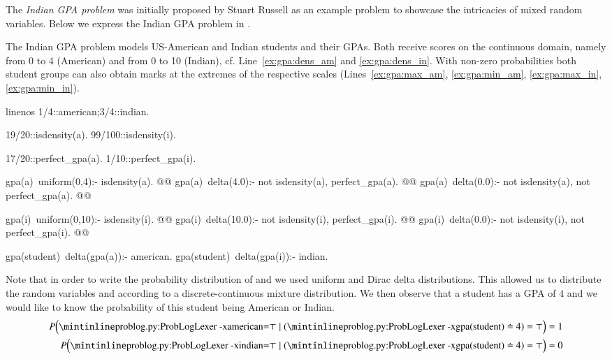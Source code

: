 The {\em Indian GPA problem} was initially proposed by Stuart Russell as an example problem to showcase the intricacies of mixed random variables.
Below we express the Indian GPA problem in \dcproblogsty.

\begin{example} \label{ex:indian_gpa}
The Indian GPA problem models US-American and Indian students and their GPAs. Both receive scores on the continuous domain, namely from 0 to 4 (American) and from 0 to 10 (Indian), cf. Line~\ref{ex:gpa:dens_am} and \ref{ex:gpa:dens_in}. With non-zero probabilities both student groups can also obtain marks at the extremes of the respective scales (Lines~\ref{ex:gpa:max_am}, \ref{ex:gpa:min_am}, \ref{ex:gpa:max_in}, \ref{ex:gpa:min_in}). 

\begin{problog*}{linenos}
1/4::american;3/4::indian.

19/20::isdensity(a).
99/100::isdensity(i).

17/20::perfect_gpa(a).
1/10::perfect_gpa(i).

gpa(a)~uniform(0,4):- isdensity(a). @\label{ex:gpa:dens_am}@
gpa(a)~delta(4.0):- not isdensity(a), perfect_gpa(a).  @\label{ex:gpa:max_am}@
gpa(a)~delta(0.0):- not isdensity(a), not perfect_gpa(a). @\label{ex:gpa:min_am}@
     
gpa(i)~uniform(0,10):- isdensity(i). @\label{ex:gpa:dens_in}@
gpa(i)~delta(10.0):- not isdensity(i), perfect_gpa(i).  @\label{ex:gpa:max_in}@
gpa(i)~delta(0.0):- not isdensity(i), not perfect_gpa(i).  @\label{ex:gpa:min_in}@
    
gpa(student)~delta(gpa(a)):- american.
gpa(student)~delta(gpa(i)):- indian.
\end{problog*}
Note that in order to write the probability distribution of  and  we used uniform and Dirac delta distributions. This allowed us to distribute the random variables  and  according to a discrete-continuous mixture distribution.
We then observe that a student has a GPA of $4$ and we would like to know the probability of this student being American or Indian. 
\begin{align}
P\Bigl(\text{\probloginline{american}}{=}\top \mid (\text{\probloginline{gpa(student)}}\doteq4)=\top \Bigr)&=1 
\nonumber \\
P \Bigl(\text{\probloginline{indian}}{=}\top \mid (\text{\probloginline{gpa(student)}}\doteq4)=\top \Bigr)&=0 \nonumber
\end{align}
\end{example}






